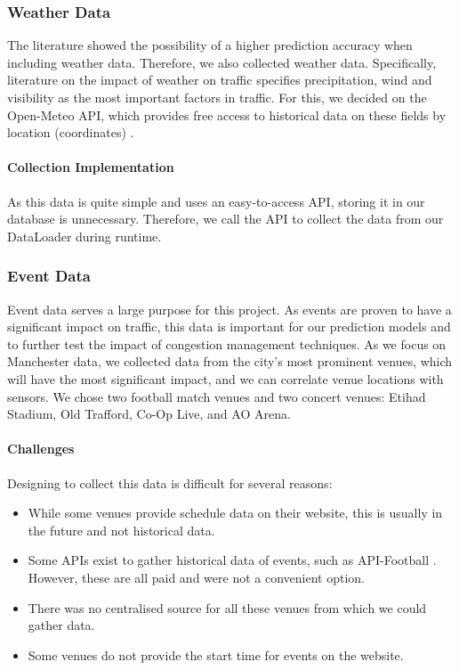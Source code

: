 \subsubsection{Weather Data}
The literature showed the possibility of a higher prediction accuracy when including weather data. Therefore, we also collected weather data. Specifically, literature on the impact of weather on traffic specifies precipitation, wind and visibility as the most important factors \cite{bi_data-driven_2022} in traffic. For this, we decided on the Open-Meteo API, which provides free access to historical data on these fields by location (coordinates) \cite{meteo}.

\paragraph{Collection Implementation}
As this data is quite simple and uses an easy-to-access API, storing it in our database is unnecessary. Therefore, we call the API to collect the data from our DataLoader during runtime.

\subsubsection{Event Data}
Event data serves a large purpose for this project. As events are proven to have a significant impact on traffic, this data is important for our prediction models and to further test the impact of congestion management techniques. As we focus on Manchester data, we collected data from the city’s most prominent venues, which will have the most significant impact, and we can correlate venue locations with sensors. We chose two football match venues and two concert venues: Etihad Stadium, Old Trafford, Co-Op Live, and AO Arena.

\paragraph{Challenges}
Designing to collect this data is difficult for several reasons:
\begin{itemize}
    \item While some venues provide schedule data on their website, this is usually in the future and not historical data.
    \item Some APIs exist to gather historical data of events, such as API-Football \cite{football_api-football_nodate}. However, these are all paid and were not a convenient option.
    \item There was no centralised source for all these venues from which we could gather data.
    \item Some venues do not provide the start time for events on the website.
\end{itemize}


